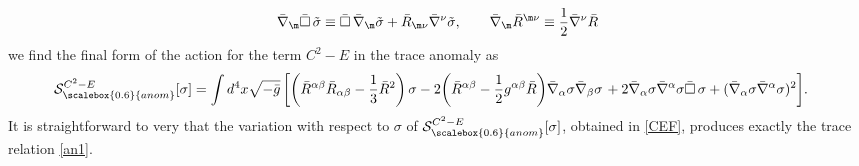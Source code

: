 \documentclass[a4paper,11pt,openright,twoside]{book}
\let\a=\alpha   \let\b=\beta   \let\g=\gamma   \let\d=\delta
\let\n=\nu      \let\x=\xi     \let\p=\pi      \let\r=\rho
\let\s=\sigma  \let\t=\tau     \let\u=\upsilon \let\f=\phi
\numberwithin{equation}{section}
\begin{document}
{{{{\begin{equation}
		\bar\nabla_\m\bar\square\,\tilde\s\equiv\bar\square\,\bar\nabla_\m\tilde\s+\bar R_{\m\n}\bar\nabla^\n\tilde\s,\qquad \bar\nabla_\m\bar R^{\m\n}\equiv\frac{1}{2}\bar\nabla^\n \bar R
	\end{equation} 
	we find the final form of the action for the term $C^2-E$ in the trace anomaly as
	\begin{align}
		\mathcal{S}_{\scalebox{0.6}{anom}}^{C^2-E}[\s]&=\int d^4x\sqrt{-\bar g}\left[\left(\bar R^{\a\b}\bar R_{\a\b}-\frac{1}{3}\bar R^2\right)\s -2\bigg(\bar R^{\a\b}-\frac{1}{2}g^{\a\b}\bar R\bigg)\bar\nabla_{\a}\s\bar\nabla_\b\s\right.+2\bar\nabla_\a\s\bar\nabla^\a\s\bar\square\,\s+(\bar\nabla_\a\s\bar\nabla^\a\s)^2\bigg]\label{CEF}.
	\end{align}
	It is straightforward to very that the variation with respect to $\s$ of $\mathcal{S}_{\scalebox{0.6}{anom}}^{C^2-E}[\s]$, obtained in \eqref{CEF}, produces exactly the trace relation \eqref{an1}.
	
}}}}
\end{document}
